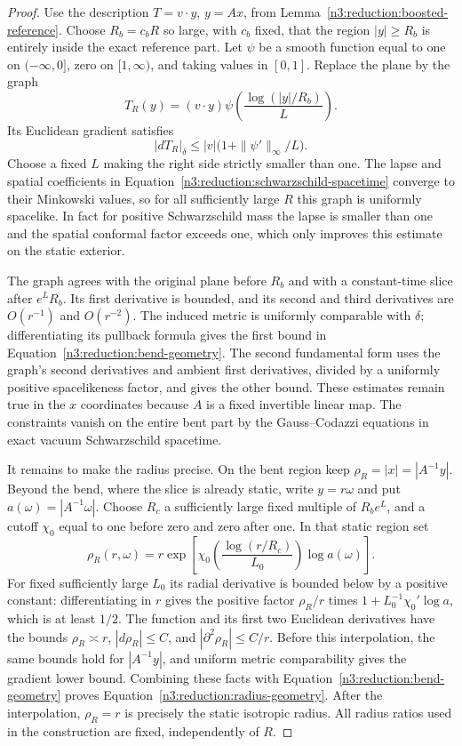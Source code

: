 \begin{proof}
Use the description $T=v\cdot y$, $y=Ax$, from
Lemma~\ref{n3:reduction:boosted-reference}.  Choose $R_b=c_bR$ so large,
with $c_b$ fixed, that the region $|y|\ge R_b$ is entirely inside the
exact reference part.  Let $\psi$ be a smooth function equal to one on
$(-\infty,0]$, zero on $[1,\infty)$, and taking values in $[0,1]$.
Replace the plane by the graph
\begin{equation}
 \label{n3:reduction:bending-graph}
 T_R(y)=(v\cdot y)
           \psi\left(\frac{\log(|y|/R_b)}{L}\right).
\end{equation}
Its Euclidean gradient satisfies
\[
 |dT_R|_\delta\le |v|\bigl(1+\|\psi'\|_\infty/L\bigr).
\]
Choose a fixed $L$ making the right side strictly smaller than one.
The lapse and spatial coefficients in
Equation~\eqref{n3:reduction:schwarzschild-spacetime} converge to their
Minkowski values, so for all sufficiently large $R$ this graph is
uniformly spacelike.  In fact for positive Schwarzschild mass the lapse
is smaller than one and the spatial conformal factor exceeds one,
which only improves this estimate on the static exterior.

The graph agrees with the original plane before $R_b$ and with a
constant-time slice after $e^LR_b$.  Its first derivative is bounded,
and its second and third derivatives are $O(r^{-1})$ and $O(r^{-2})$.
The induced metric is uniformly comparable with $\delta$; differentiating
its pullback formula gives the first bound in
Equation~\eqref{n3:reduction:bend-geometry}.  The second fundamental form
uses the graph's second derivatives and ambient first derivatives,
divided by a uniformly positive spacelikeness factor, and gives the
other bound.  These estimates remain true in the $x$ coordinates because
$A$ is a fixed invertible linear map.  The constraints vanish on the
entire bent part by the Gauss--Codazzi equations in exact vacuum
Schwarzschild spacetime.

It remains to make the radius precise.  On the bent region keep
$\rho_R=|x|=|A^{-1}y|$.  Beyond the bend, where the slice is already
static, write $y=r\omega$ and put $a(\omega)=|A^{-1}\omega|$.  Choose
$R_c$ a sufficiently large fixed multiple of $R_b e^L$, and a cutoff
$\chi_0$ equal to one before zero and zero after one.  In that static
region set
\[
 \rho_R(r,\omega)
 =r\exp\left[
    \chi_0\left(\frac{\log(r/R_c)}{L_0}\right)\log a(\omega)\right].
\]
For fixed sufficiently large $L_0$ its radial derivative is bounded
below by a positive constant: differentiating in $r$ gives the positive
factor $\rho_R/r$ times
$1+L_0^{-1}\chi_0'\log a$, which is at least $1/2$.
The function and its first two Euclidean derivatives have the bounds
$\rho_R\asymp r$, $|d\rho_R|\le C$, and
$|\partial^2\rho_R|\le C/r$.  Before this interpolation, the same
bounds hold for $|A^{-1}y|$, and uniform metric comparability gives the
gradient lower bound.  Combining these facts with
Equation~\eqref{n3:reduction:bend-geometry} proves
Equation~\eqref{n3:reduction:radius-geometry}.  After the interpolation,
$\rho_R=r$ is precisely the static isotropic radius.  All radius ratios
used in the construction are fixed, independently of $R$.
\end{proof}

